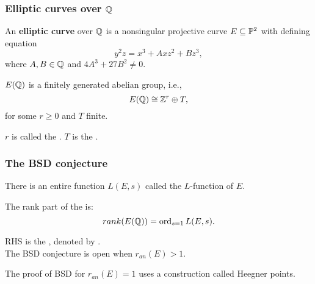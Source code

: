 \documentclass[handout]{beamer}
\begin{document}
\begin{frame}
\frametitle{Elliptic curves over $\mathbb{Q}$}
\begin{Def}
An {\bf elliptic curve }over $\mathbb{Q}$ is a nonsingular projective curve $E \subseteq \mathbb{P}^2$ with defining equation 
\begin{equation*}
y^2z = x^3 + Axz^2+Bz^3, 
\end{equation*}
where $A,B \in \mathbb{Q}$ and  $4A^3+27B^2 \neq 0$.
\end{Def}



\pause

\begin{theorem}
$E(\mathbb{Q})$ is a finitely generated abelian group, i.e., $$E(\mathbb{Q}) \cong \mathbb{Z}^r \oplus T,$$
for some $r \geq 0$ and $T$ finite. 
\end{theorem}
$r$ is called the . $T$ is the . 

\end{frame}



\begin{frame}
\frametitle{The BSD conjecture} 


There is an entire function $L(E,s)$ called the $L$-function of $E$.  \\

\medskip

The rank part of the   is:
\begin{equation*}
	rank(E(\mathbb{Q})) = \operatorname{ord}_{s=1}L(E,s).
\end{equation*}

\pause

RHS is the , denoted by . \\
The BSD conjecture is open when $r_{an}(E) > 1$. \\

\medskip
\pause

The proof of BSD for $r_{an}(E) = 1$ uses a construction called Heegner points. 


\end{frame}
\end{document}
